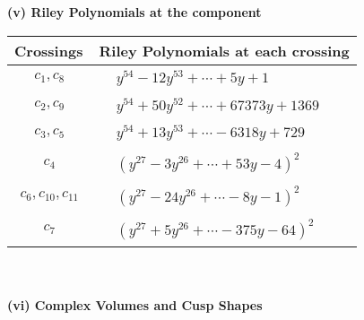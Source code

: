 \documentclass[1p]{elsarticle_modified}
\theoremstyle{definition}
\begin{document}
\newpage\renewcommand{\arraystretch}{1}
\flushleft \textbf{(v) Riley Polynomials at the component}\newline \\
\begin{tabular}{m{50pt}|m{274pt}}
Crossings & \hspace{64pt}Riley Polynomials at each crossing \\
\hline $$\begin{aligned}c_{1},c_{8}\end{aligned}$$&$\begin{aligned}
&y^{54}-12 y^{53}+\cdots+5 y+1
\end{aligned}$\\
\hline $$\begin{aligned}c_{2},c_{9}\end{aligned}$$&$\begin{aligned}
&y^{54}+50 y^{52}+\cdots+67373 y+1369
\end{aligned}$\\
\hline $$\begin{aligned}c_{3},c_{5}\end{aligned}$$&$\begin{aligned}
&y^{54}+13 y^{53}+\cdots-6318 y+729
\end{aligned}$\\
\hline $$\begin{aligned}c_{4}\end{aligned}$$&$\begin{aligned}
&(y^{27}-3 y^{26}+\cdots+53 y-4)^{2}
\end{aligned}$\\
\hline $$\begin{aligned}c_{6},c_{10},c_{11}\end{aligned}$$&$\begin{aligned}
&(y^{27}-24 y^{26}+\cdots-8 y-1)^{2}
\end{aligned}$\\
\hline $$\begin{aligned}c_{7}\end{aligned}$$&$\begin{aligned}
&(y^{27}+5 y^{26}+\cdots-375 y-64)^{2}
\end{aligned}$\\
\hline
\end{tabular}\\~\\
\newpage\flushleft \textbf{(vi) Complex Volumes and Cusp Shapes}
\end{document}
